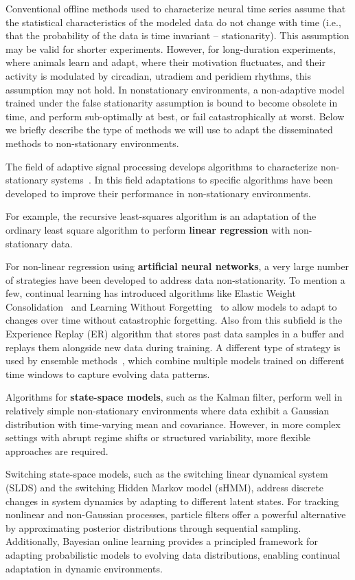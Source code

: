 Conventional offline methods used to characterize neural time series assume
that the statistical characteristics of the modeled data do not change with
time (i.e., that the probability of the data is time invariant --
stationarity). This assumption may be valid for shorter experiments. However,
for long-duration experiments, where animals learn and adapt, where their
motivation fluctuates, and their activity is modulated by circadian, utradiem
and peridiem rhythms, this assumption may not hold. In nonstationary
environments, a non-adaptive model trained under the false stationarity
assumption is bound to become obsolete in time, and perform sub-optimally at
best, or fail catastrophically at worst.
%
Below we briefly describe the type of methods we will use to adapt the
disseminated methods to non-stationary environments.

The field of adaptive signal processing develops algorithms to characterize
non-stationary systems~\citep{haykin02}. In this field adaptations to specific
algorithms have been developed to improve their performance in non-stationary
environments.

For example, the recursive least-squares algorithm \citep[][Chapter
9]{haykin02} is an adaptation of the ordinary least square algorithm to perform
\textbf{linear regression} with non-stationary data.

For non-linear regression using \textbf{artificial neural networks}, a very large number
of strategies have been developed to address data non-stationarity. To mention
a few, continual learning has introduced algorithms like  Elastic Weight
Consolidation~\citep[EWC][]{} and Learning Without Forgetting~\citep[LwF][]{}
to allow models to adapt to changes over time without catastrophic forgetting.
Also from this subfield is the Experience Replay (ER) algorithm that stores
past data samples in a buffer and replays them alongside new data during
training. A different type of strategy is used by ensemble methods~\citep{},
which combine multiple models trained on different time windows to capture
evolving data patterns.

Algorithms for \textbf{state-space models}, such as the Kalman filter, perform well in
relatively simple non-stationary environments where data exhibit a Gaussian
distribution with time-varying mean and covariance. However, in more complex
settings with abrupt regime shifts or structured variability, more flexible
approaches are required.

Switching state-space models, such as the switching linear dynamical system
(SLDS) and the switching Hidden Markov model (sHMM), address discrete changes
in system dynamics by adapting to different latent states. For tracking
nonlinear and non-Gaussian processes, particle filters offer a powerful
alternative by approximating posterior distributions through sequential
sampling. Additionally, Bayesian online learning provides a principled
framework for adapting probabilistic models to evolving data distributions,
enabling continual adaptation in dynamic environments.

